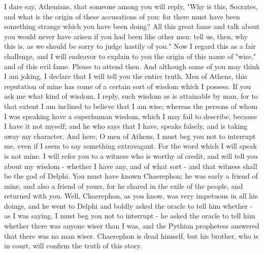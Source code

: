 I dare say, Athenians, that someone among you will reply, "Why is
this, Socrates, and what is the origin of these accusations of you:
for there must have been something strange which you have been doing?
All this great fame and talk about you would never have arisen if
you had been like other men: tell us, then, why this is, as we should
be sorry to judge hastily of you." Now I regard this as a fair challenge,
and I will endeavor to explain to you the origin of this name of "wise,"
and of this evil fame. Please to attend then. And although some of
you may think I am joking, I declare that I will tell you the entire
truth. Men of Athens, this reputation of mine has come of a certain
sort of wisdom which I possess. If you ask me what kind of wisdom,
I reply, such wisdom as is attainable by man, for to that extent I
am inclined to believe that I am wise; whereas the persons of whom
I was speaking have a superhuman wisdom, which I may fail to describe,
because I have it not myself; and he who says that I have, speaks
falsely, and is taking away my character. And here, O men of Athens,
I must beg you not to interrupt me, even if I seem to say something
extravagant. For the word which I will speak is not mine. I will refer
you to a witness who is worthy of credit, and will tell you about
my wisdom - whether I have any, and of what sort - and that witness
shall be the god of Delphi. You must have known Chaerephon; he was
early a friend of mine, and also a friend of yours, for he shared
in the exile of the people, and returned with you. Well, Chaerephon,
as you know, was very impetuous in all his doings, and he went to
Delphi and boldly asked the oracle to tell him whether - as I was
saying, I must beg you not to interrupt - he asked the oracle to tell
him whether there was anyone wiser than I was, and the Pythian prophetess
answered that there was no man wiser. Chaerephon is dead himself,
but his brother, who is in court, will confirm the truth of this story.

